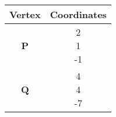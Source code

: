 \begin{tabular}[12pt]{ |c| c|}
    \hline
    \textbf{Vertex} & \textbf{Coordinates}\\ 
    \hline
    \textbf{P} & \myvec{2 \\ 1 \\ -1} \\
    \hline 
    \textbf{Q} & \myvec{4 \\ 4 \\ -7}\\
    \hline
    \end{tabular}
